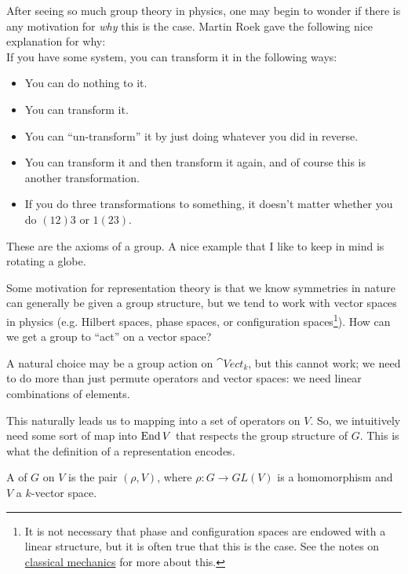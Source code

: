 \documentclass[11pt]{article}
\begin{document}
\begin{reemark}
    After seeing so much group theory in physics, one may begin to
    wonder if there is any motivation for \emph{why} this is the case.
    Martin Roek gave the following nice explanation for why:\\
    
    \noin
    If you have some system, you can transform it in the following
    ways:
    \begin{itemize}
        \item You can do nothing to it.
        \item You can transform it.
        \item You can ``un-transform'' it by just doing whatever you did
        in reverse.
        \item You can transform it and then transform it again,
        and of course this is another transformation.
        \item If you do three transformations to something,
        it doesn't matter whether you do $(12)3$ or $1(23)$.
    \end{itemize}
    These are the axioms of a group. A nice example that I like
    to keep in mind is rotating a globe.
\end{reemark}

Some motivation for representation theory is that we
know symmetries in nature can generally be given a group structure,
but we tend to work with vector spaces in physics (e.g. Hilbert
spaces, phase spaces, or configuration spaces\footnote{It is
not necessary that phase and configuration spaces are endowed with a linear
structure, but it is often true that this is the case.
See the notes on 
\href{https://github.com/will-lancer/notes/blob/main/Physics/Four_Mechanics/FourMechanics.pdf}{classical mechanics} 
for more about this.}).
How can we get a group to ``act'' on a vector space?

A natural choice may be a group action on $\cat{Vect}_k$, 
but this cannot work; we need to do more than just permute
operators and vector spaces: we need linear combinations of elements.

This naturally leads us to mapping into a set of operators on 
$V$. So, we intuitively need some sort of map into $\operatorname{End}{V}$ that 
respects the group structure of $G$. This is what the definition 
of a representation encodes.

\begin{definition}
    A  of $G$ on $V$ is the pair $(\rho, V)$,
    where $\rho \colon G \to GL(V)$ is a homomorphism and $V$
    a $k$-vector space.
\end{definition}
\end{document}
